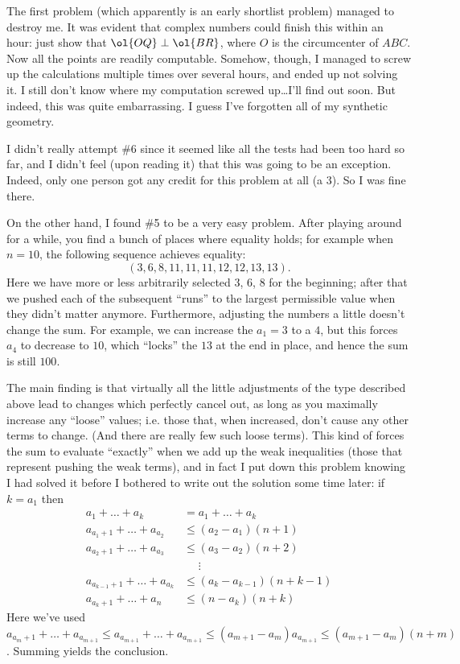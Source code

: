 \documentclass[11pt]{scrreprt}
\begin{document}
The first problem (which apparently is an early shortlist problem) managed to destroy me.
It was evident that complex numbers could finish this within an hour: just show that $\ol{OQ} \perp \ol{BR}$,
where $O$ is the circumcenter of $ABC$. Now all the points are readily computable.
Somehow, though, I managed to screw up the calculations multiple times over several hours,
and ended up not solving it. I still don't know where my computation screwed up\dots I'll find out soon.
But indeed, this was quite embarrassing. I guess I've forgotten all of my synthetic geometry.

I didn't really attempt \#6 since it seemed like all the tests had been too hard so far,
and I didn't feel (upon reading it) that this was going to be an exception.
Indeed, only one person got any credit for this problem at all (a 3). So I was fine there.

On the other hand, I found \#5 to be a very easy problem.
After playing around for a while, you find a bunch of places where equality holds; for example when $n=10$,
the following sequence achieves equality:
\[ \left( 3,6,8,11,11,11,12,12,13,13 \right). \]
Here we have more or less arbitrarily selected $3$, $6$, $8$ for the beginning;
after that we pushed each of the subsequent ``runs'' to the largest permissible
value when they didn't matter anymore.
Furthermore, adjusting the numbers a little doesn't change the sum.
For example, we can increase the $a_1 = 3$ to a $4$, but this forces $a_4$ to decrease to $10$,
which ``locks'' the $13$ at the end in place, and hence the sum is still $100$.

The main finding is that virtually all the little adjustments of the type
described above lead to changes which perfectly cancel out,
as long as you maximally increase any ``loose'' values; {i.e.} those that, when increased,
don't cause any other terms to change. (And there are really few such loose terms).
This kind of forces the sum to evaluate ``exactly'' when we add up the weak
inequalities (those that represent pushing the weak terms),
and in fact I put down this problem knowing I had solved it before I bothered to
write out the solution some time later: if $k=a_1$ then
\begin{align*}
  a_1 + \dots + a_k &= a_1 + \dots + a_k \\
  a_{a_1+1} + \dots + a_{a_2} &\le \left( a_2-a_1 \right)\left( n+1 \right) \\
  a_{a_2+1} + \dots + a_{a_3} &\le (a_3-a_2)(n+2) \\
  &\phantom\le\vdots \\
  a_{a_{k-1}+1} + \dots + a_{a_k} &\le \left( a_k-a_{k-1} \right)(n+k-1) \\
  a_{a_k+1} + \dots + a_n &\le (n-a_k)(n+k)
\end{align*}
Here we've used $a_{a_m+1} + \dots + a_{a_{m+1}} \le a_{a_{m+1}} + \dots + a_{a_{m+1}} \le \left( a_{m+1}-a_m \right)a_{a_{m+1}}
\le \left( a_{m+1}-a_m \right)(n+m)$. Summing yields the conclusion.
\end{document}
